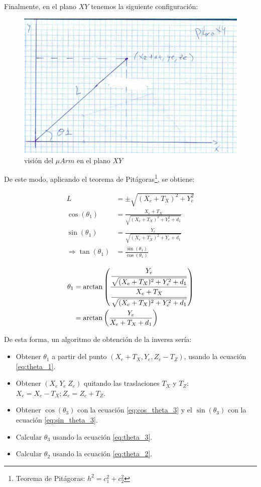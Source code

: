 \documentclass[a4paper,12pt]{article}
\begin{document}
Finalmente, en el plano $XY$ tenemos la siguiente configuración:

\begin{figure}[H]
    \centering
    \includegraphics[width=.8\linewidth]{images/ik_xy_ok.png}
    \caption{visión del $\mu Arm$ en el plano $XY$}
    \label{fig:uarm_xy_ok}
\end{figure}

De este modo, aplicando el teorema de Pitágoras\footnote
{Teorema de Pitágoras: $h^2 = c_1^2 + c_2^2$}, se obtiene:

\begin{align*}
    L                              & = \pm \sqrt{(X_e + T_X)^2 + Y_e^2}                     \\
    \cos(\theta_1)                 & = \frac{X_e + T_X}{\sqrt{(X_e + T_X)^2 + Y_e^2 + d_1}} \\
    \sin(\theta_1)                 & = \frac{Y_e}{\sqrt{(X_e + T_X)^2 + Y_e + d_1}}         \\
    \Longrightarrow \tan(\theta_1) & = \frac{\sin(\theta_1)}{\cos(\theta_1)}                \\
\end{align*}
\begin{align}
    \theta_1 & = \arctan\left(\frac{\cfrac{Y_e}{\sqrt{(X_e + T_X)^2 + Y_e^2 + d_1}}}{\cfrac{X_e + T_X}{\sqrt{(X_e + T_X)^2 + Y_e^2 + d_1}}}\right) \\
             & = \arctan\left(\frac{Y_e}{X_e + T_X + d_1}\right) \label{eq:theta_1}
\end{align}

De esta forma, un algoritmo de obtención de la inversa sería:

\begin{itemize}
    \item Obtener $\theta_1$ a partir del punto $(X_e + T_X, Y_e, Z_e - T_Z)$, usando la ecuación \ref{eq:theta_1}.
    \item Obtener $(X_e ~ Y_e ~ Z_e)$ quitando las traslaciones $T_X$ y $T_Z$: $X_e = X_e - T_X; Z_e = Z_e + T_Z$.
    \item Obtener $\cos(\theta_3)$ con la ecuación \ref{eq:cos_theta_3} y el $\sin(\theta_3)$ con la ecuación \ref{eq:sin_theta_3}.
    \item Calcular $\theta_3$ usando la ecuación \ref{eq:theta_3}.
    \item Calcular $\theta_2$ usando la ecuación \ref{eq:theta_2}.
\end{itemize}
\end{document}
